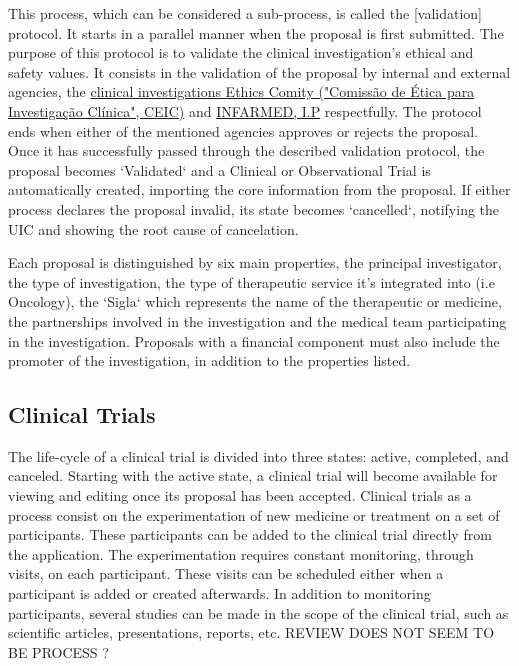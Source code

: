 This process, which can be considered a sub-process, is called the [validation] protocol. It starts in a parallel manner when the proposal is first submitted.  
The purpose of this protocol is to validate the clinical investigation's ethical and safety values. It consists in the validation of the proposal by internal and external agencies, the \href{https://www.ceic.pt/}{clinical investigations Ethics Comity ("Comissão de Ética para Investigação Clínica", CEIC)} and \href{https://www.infarmed.pt/web/infarmed}{INFARMED, I.P} respectfully. The protocol ends when either of the mentioned agencies approves or rejects the proposal.  
Once it has successfully passed through the described validation protocol, the proposal becomes `Validated` and a Clinical or Observational Trial is automatically created, importing the core information from the proposal.  
If either process declares the proposal invalid, its state becomes `cancelled`, notifying the UIC and showing the root cause of cancelation.

Each proposal is distinguished by six main properties, the principal investigator, the type of investigation, the type of therapeutic service it's integrated into (i.e Oncology), the `Sigla` which represents the name of the therapeutic or medicine, the partnerships involved in the investigation and the medical team participating in the investigation.  
Proposals with a financial component must also include the promoter of the investigation, in addition to the properties listed.  

\subsection{Clinical Trials} 
The life-cycle of a clinical trial is divided into three states: active, completed, and canceled.  
Starting with the active state, a clinical trial will become available for viewing and editing once its proposal has been accepted. 
Clinical trials as a process consist on the experimentation of new medicine or treatment on a set of participants. These participants can be added to the clinical trial directly from the application. The experimentation requires constant monitoring, through visits, on each participant. These visits can be scheduled either when a participant is added or created afterwards.  
In addition to monitoring participants, several studies can be made in the scope of the clinical trial, such as scientific articles, presentations, reports, etc. 
REVIEW DOES NOT SEEM TO BE PROCESS ?

